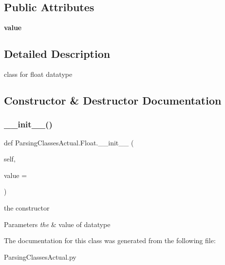\subsection*{Public Attributes}
\begin{DoxyCompactItemize}
\item 
\mbox{\label{class_parsing_classes_actual_1_1_float_ad209bb476885a17b23cc2a54646794a3}} 
{\bfseries value}
\end{DoxyCompactItemize}


\subsection{Detailed Description}
class for float datatype 

\subsection{Constructor \& Destructor Documentation}
\mbox{\label{class_parsing_classes_actual_1_1_float_a285387447fcf577d0ef3b1f3f8f4e69b}} 
\subsubsection{\texorpdfstring{\+\_\+\+\_\+init\+\_\+\+\_\+()}{\_\_init\_\_()}}
{\footnotesize\ttfamily def Parsing\+Classes\+Actual.\+Float.\+\_\+\+\_\+init\+\_\+\+\_\+ (\begin{DoxyParamCaption}\item[{}]{self,  }\item[{}]{value = {} }\end{DoxyParamCaption})}



the constructor 


\begin{DoxyParams}{Parameters}
{\em the} & value of datatype \\
\hline
\end{DoxyParams}


The documentation for this class was generated from the following file\+:\begin{DoxyCompactItemize}
\item 
Parsing\+Classes\+Actual.\+py\end{DoxyCompactItemize}
